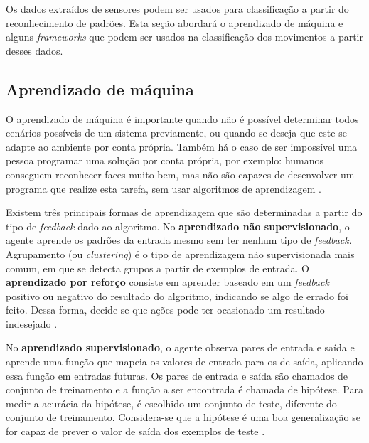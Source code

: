 Os dados extraídos de sensores podem ser usados para classificação a partir do reconhecimento de padrões. Esta seção abordará o aprendizado de máquina e alguns \textit{frameworks} que podem ser usados na classificação dos movimentos a partir desses dados.

\subsection{Aprendizado de máquina}
\label{sec:ml}

O aprendizado de máquina é importante quando não é possível determinar todos cenários possíveis de um sistema previamente, ou quando se deseja que este se adapte ao ambiente por conta própria. Também há o caso de ser impossível uma pessoa programar uma solução por conta própria, por exemplo: humanos conseguem reconhecer faces muito bem, mas não são capazes de desenvolver um programa que realize esta tarefa, sem usar algoritmos de aprendizagem \cite{russell:2010}.

Existem três principais formas de aprendizagem que são determinadas a partir do tipo de \textit{feedback} dado ao algoritmo. No \textbf{aprendizado não supervisionado}, o agente aprende os padrões da entrada mesmo sem ter nenhum tipo de \textit{feedback}. Agrupamento (ou \textit{clustering}) é o tipo de aprendizagem não supervisionada mais comum, em que se detecta grupos a partir de exemplos de entrada. O \textbf{aprendizado por reforço} consiste em aprender baseado em um \textit{feedback} positivo ou negativo do resultado do algoritmo, indicando se algo de errado foi feito. Dessa forma, decide-se que ações pode ter ocasionado um resultado indesejado \cite{russell:2010}.

No \textbf{aprendizado supervisionado}, o agente observa pares de entrada e saída e aprende uma função que mapeia os valores de entrada para os de saída, aplicando essa função em entradas futuras. Os pares de entrada e saída são chamados de conjunto de treinamento e a função a ser encontrada é chamada de hipótese. Para medir a acurácia da hipótese, é escolhido um conjunto de teste, diferente do conjunto de treinamento. Considera-se que a hipótese é uma boa generalização se for capaz de prever o valor de saída dos exemplos de teste \cite{russell:2010}.

